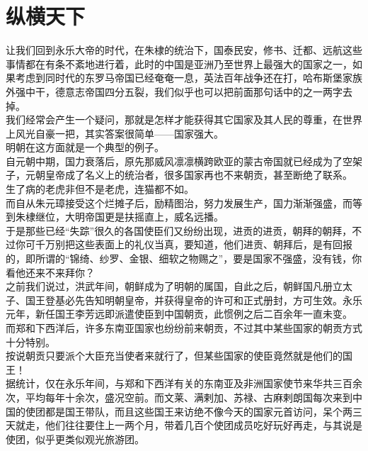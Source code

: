 \section{纵横天下}
\ifnum{}
	\begin{multicols}{\theparacolNo}
\fi
让我们回到永乐大帝的时代，在朱棣的统治下，国泰民安，修书、迁都、远航这些事情都在有条不紊地进行着，此时的中国是亚洲乃至世界上最强大的国家之一，如果考虑到同时代的东罗马帝国已经奄奄一息，英法百年战争还在打，哈布斯堡家族外强中干，德意志帝国四分五裂，我们似乎也可以把前面那句话中的之一两字去掉。\\

我们经常会产生一个疑问，那就是怎样才能获得其它国家及其人民的尊重，在世界上风光自豪一把，其实答案很简单——国家强大。\\

明朝在这方面就是一个典型的例子。\\

自元朝中期，国力衰落后，原先那威风凛凛横跨欧亚的蒙古帝国就已经成为了空架子，元朝皇帝成了名义上的统治者，很多国家再也不来朝贡，甚至断绝了联系。\\

生了病的老虎非但不是老虎，连猫都不如。\\

而自从朱元璋接受这个烂摊子后，励精图治，努力发展生产，国力渐渐强盛，而等到朱棣继位，大明帝国更是扶摇直上，威名远播。\\

于是那些已经“失踪”很久的各国使臣们又纷纷出现，进贡的进贡，朝拜的朝拜，不过你可千万别把这些表面上的礼仪当真，要知道，他们进贡、朝拜后，是有回报的，即所谓的“锦绮、纱罗、金银、细软之物赐之”，要是国家不强盛，没有钱，你看他还来不来拜你？\\

之前我们说过，洪武年间，朝鲜成为了明朝的属国，自此之后，朝鲜国凡册立太子、国王登基必先告知明朝皇帝，并获得皇帝的许可和正式册封，方可生效。永乐元年，新任国王李芳远即派遣使臣到中国朝贡，此惯例之后二百余年一直未变。\\

而郑和下西洋后，许多东南亚国家也纷纷前来朝贡，不过其中某些国家的朝贡方式十分特别。\\

按说朝贡只要派个大臣充当使者来就行了，但某些国家的使臣竟然就是他们的国王！\\

据统计，仅在永乐年间，与郑和下西洋有关的东南亚及非洲国家使节来华共三百余次，平均每年十余次，盛况空前。而文莱、满剌加、苏禄、古麻剌朗国每次来到中国的使团都是国王带队，而且这些国王来访绝不像今天的国家元首访问，呆个两三天就走，他们往往要住上一两个月，带着几百个使团成员吃好玩好再走，与其说是使团，似乎更类似观光旅游团。\\


\end{multicols}
